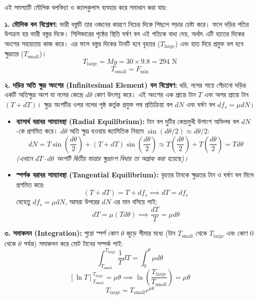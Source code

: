 \documentclass[12pt, a4paper]{article}
\begin{document}
\begin{tcolorbox}[solutionbox={সমাধান (Solution)}]
\noindent
এই সমস্যাটি মৌলিক বলবিদ্যা ও ক্যালকুলাস ব্যবহার করে সমাধান করা যায়:

\vspace{0.5em}
\textbf{১. মৌলিক বল বিশ্লেষণ:}
ভারী বস্তুটি তার ওজনের কারণে নিচের দিকে পিছলে পড়ার চেষ্টা করে। ফলে দড়ির গতির উপক্রম হয় ভারী বস্তুর দিকে। সিলিন্ডারের পৃষ্ঠের স্থিতি ঘর্ষণ বল এই গতিকে বাধা দেয়, অর্থাৎ এটি হাতের দিকের অংশের সহায়তায় কাজ করে।
এর ফলে বস্তুর দিকের টানটি হবে বৃহত্তর ($T_{\text{large}}$) এবং হাত দিয়ে প্রযুক্ত বল হবে ক্ষুদ্রতর ($T_{\text{small}}$)।
$$T_{\text{large}} = Mg = 30 \times 9.8 = 294\text{ N}$$
$$T_{\text{small}} = F_{\min}$$

\vspace{0.5em}
\textbf{২. দড়ির অতি ক্ষুদ্র অংশের (Infinitesimal Element) বল বিশ্লেষণ:}
ধরি, নলের গায়ে পেঁচানো দড়ির একটি অতিক্ষুদ্র অংশ যা নলের কেন্দ্রে $d\theta$ কোণ উৎপন্ন করে। এই অংশের এক প্রান্তে টান $T$ এবং অপর প্রান্তে টান $(T + dT)$। 
ক্ষুদ্র অংশটির ওপর নলের পৃষ্ঠ কর্তৃক প্রযুক্ত লম্ব প্রতিক্রিয়া বল $dN$ এবং ঘর্ষণ বল $df_s = \mu dN$।

\begin{itemize}[leftmargin=1.5em, itemsep=0.2em]
    \item \textbf{ব্যাসার্ধ বরাবর সাম্যাবস্থা (Radial Equilibrium):} 
    টান বল দুটির কেন্দ্রমুখী উপাংশ অভিলম্ব বল $dN$-কে প্রশমিত করে। $d\theta$ অতি ক্ষুদ্র হওয়ায় জ্যামিতিক নিয়মে $\sin(d\theta/2) \approx d\theta/2$:
    $$dN = T \sin\left(\frac{d\theta}{2}\right) + (T + dT) \sin\left(\frac{d\theta}{2}\right) \approx T \left(\frac{d\theta}{2}\right) + T \left(\frac{d\theta}{2}\right) = T d\theta$$
    \textit{(এখানে $dT \cdot d\theta$ অংশটি দ্বিতীয় মাত্রার ক্ষুদ্রাংশ বিধায় তা অগ্রাহ্য করা হয়েছে)।}
    
    \item \textbf{স্পর্শক বরাবর সাম্যাবস্থা (Tangential Equilibrium):}
    বৃহত্তর টানকে ক্ষুদ্রতর টান ও ঘর্ষণ বল মিলে প্রশমিত করে:
    $$(T + dT) = T + df_s \implies dT = df_s$$
    যেহেতু $df_s = \mu dN$, আমরা উপরের $dN$ এর মান বসিয়ে পাই:
    $$dT = \mu (T d\theta) \implies \frac{dT}{T} = \mu d\theta$$
\end{itemize}

\vspace{0.5em}
\textbf{৩. সমাকলন (Integration):}
পুরো স্পর্শ কোণ $\theta$ জুড়ে সীমার মধ্যে (টান $T_{\text{small}}$ থেকে $T_{\text{large}}$ এবং কোণ $0$ থেকে $\theta$ পর্যন্ত) সমাকলন করে মোট টানের সম্পর্ক পাই:
$$\int_{T_{\text{small}}}^{T_{\text{large}}} \frac{1}{T} dT = \int_{0}^{\theta} \mu d\theta$$
$$\left[ \ln T \right]_{T_{\text{small}}}^{T_{\text{large}}} = \mu \theta \implies \ln\left(\frac{T_{\text{large}}}{T_{\text{small}}}\right) = \mu \theta$$
$$T_{\text{large}} = T_{\text{small}} e^{\mu \theta}$$


\end{tcolorbox}
\end{document}
